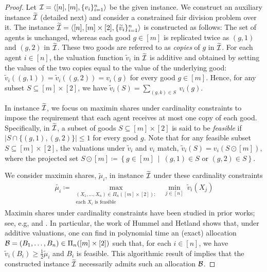 \begin{proof}
Let $\mathcal{I}=\langle [n],[m],\{v_i\}_{i=1}^n\rangle$ be the given instance. We construct an auxiliary instance $\widetilde{\mathcal{I}}$ (detailed next) and consider a constrained fair division problem over it. The instance $\widetilde{\mathcal{I}}=\langle [n], [m] \times[2],\{\widetilde{v}_i\}_{i=1}^n\rangle$ is constructed as follows: The set of agents is unchanged, whereas each good $g\in [m]$ is replicated twice as $(g,1)$ and $(g,2)$  in $\widetilde{\mathcal{I}}$. These two goods are referred to as \textit{copies} of $g$ in $\widetilde{\mathcal{I}}$. For each agent $i \in [n]$, the valuation function $\widetilde{v}_i$ in $\widetilde{\mathcal{I}}$ is additive and obtained by setting the values of the two copies equal to the value of the underlying good: $\widetilde{v}_i((g,1)) = \widetilde{v}_i((g,2)) = v_i(g)$ for every good $g \in [m]$. Hence, for any subset $S \subseteq [m] \times [2]$, we have $\widetilde{v}_i (S) = \sum_{(g,k) \in S} \ v_i(g) $.    

In instance $\widetilde{\mathcal{I}}$, we focus on maximin shares under cardinality constraints to impose the requirement that each agent receives at most one copy of each good. Specifically, in $\widetilde{\mathcal{I}}$,  a subset of goods $S \subseteq [m] \times [2]$ is said to be {\it feasible} if $\big| S \cap \{(g,1), (g,2) \} \big| \leq 1$ for every good $g$. Note that for any feasible subset $S \subseteq [m] \times [2]$, the valuations under $\widetilde{v}_i$ and $v_i$ match, $\widetilde{v}_i(S) = v_i \left( S \odot [m] \right)$, where the projected set $S \odot [m] \coloneqq \left\{ g \in [m] \ \mid \ (g,1) \in S \text{ or } (g,2) \in S \right\}$. 

We consider maximin shares, $\widetilde{\mu}_i$, in instance $\widetilde{\mathcal{I}}$ under these cardinality constraints
\begin{align}
    \widetilde{\mu_i} \coloneqq \max_{\substack{(X_1, \ldots, X_n) \in \Pi_n([m] \times [2]): \\ \text{each $X_i$ is feasible}} } \ \ \min_{j \in [n]} \  \widetilde{v}_i  (X_j) \label{eqn:mmshat}
\end{align}
Maximin shares under cardinality constraints have been studied in prior works; see, e.g, \cite{hummel2022maximin} and \cite{biswas2018fair}. In particular, the work of Hummel and Hetland \cite{hummel2022maximin} shows that, under additive valuations, one can find in polynomial time an (exact) allocation $\mathcal{B} = (B_1,\ldots, B_n) \in \Pi_n([m] \times [2])$ such that, for each $i \in [n]$, we have $\widetilde{v}_i(B_i) \geq \frac{1}{2} \widetilde{\mu}_i$ and $B_i$ is feasible. This algorithmic result of \cite{hummel2022maximin} implies that the constructed instance $\widetilde{\mathcal{I}}$ necessarily admits such an allocation $\mathcal{B}$. 


\end{proof}
